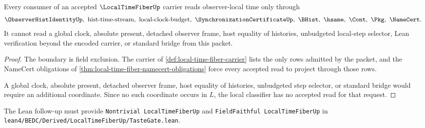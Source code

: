 \begin{theorem}
\label{thm:local-time-fiber-nonescape}
Every consumer of an accepted $\LocalTimeFiberUp$ carrier reads observer-local time only through
$$
\ObserverHistIdentityUp,\ \text{hist-time-stream},\ \text{local-clock-budget},\ \SynchronizationCertificateUp,\ \BHist,\ \hsame,\ \Cont,\ \Pkg,\ \NameCert .
$$
It cannot read a global clock, absolute present, detached observer frame, host equality of histories, unbudgeted local-step selector, Lean verification beyond the encoded carrier, or standard bridge from this packet.
\end{theorem}
\begin{proof}
The boundary is field exclusion. The carrier of \autoref{def:local-time-fiber-carrier} lists the only rows admitted by the packet, and the NameCert obligations of \autoref{thm:local-time-fiber-namecert-obligations} force every accepted read to project through those rows.

A global clock, absolute present, detached observer frame, host equality of histories, unbudgeted step selector, or standard bridge would require an additional coordinate. Since no such coordinate occurs in $L$, the local classifier has no accepted read for that request.
\end{proof}



The Lean follow-up must provide \texttt{Nontrivial LocalTimeFiberUp} and \texttt{FieldFaithful LocalTimeFiberUp} in \texttt{lean4/BEDC/Derived/LocalTimeFiberUp/TasteGate.lean}.


